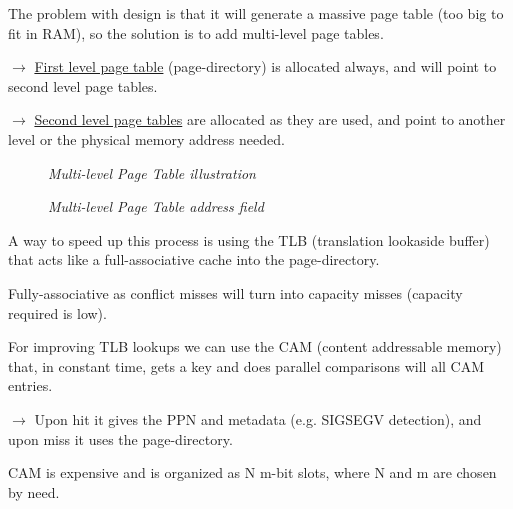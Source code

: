 \documentclass[11pt]{article}
\begin{document}
The problem with design is that it will generate a massive page table (too big to fit in RAM), so the solution is to add multi-level page tables.

$\rightarrow$ \underline{First level page table} (page-directory) is allocated always, and will point to second level page tables.

$\rightarrow$ \underline{Second level page tables} are allocated as they are used, and point to another level or the physical memory address needed.

\begin{figure}[htbp]
    \centering
    \caption{\textit{Multi-level Page Table illustration}}
\end{figure}

\begin{figure}[htbp]
    \centering
    \caption{\textit{Multi-level Page Table address field}}
\end{figure}

A way to speed up this process is using the TLB (translation lookaside buffer) that acts like a full-associative cache into the page-directory.

Fully-associative as conflict misses will turn into capacity misses (capacity required is low).

For improving TLB lookups we can use the CAM (content addressable memory) that, in constant time, gets a key and does parallel comparisons will all CAM entries.

$\rightarrow$ Upon hit it gives the PPN and metadata (e.g. SIGSEGV detection), and upon miss it uses the page-directory.

CAM is expensive and is organized as N m-bit slots, where N and m are chosen by need.
\end{document}
